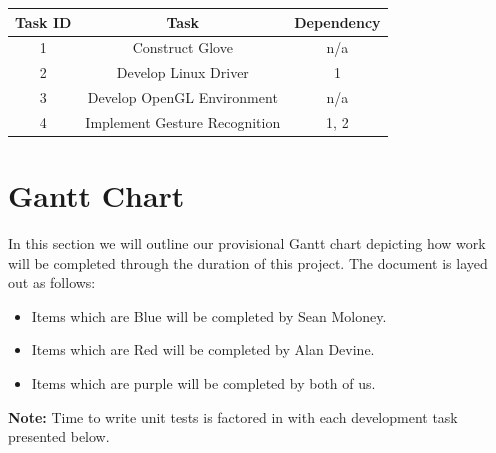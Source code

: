 \documentclass[12pt,a4paper,oneside]{book}
\theoremstyle{plain}
\numberwithin{equation}{chapter}
\newcounter{Secnum}
\begin{document}
\begin{center}
    \begin{tabular}{ |c|c|c| }
        \hline
        Task ID & Task & Dependency \\
        \hline
        \hline
        1 & Construct Glove & n/a \\
        \hline
        2 & Develop Linux Driver & 1 \\
        \hline
        3 & Develop OpenGL Environment & n/a \\
        \hline
        4 & Implement Gesture Recognition & 1, 2 \\
        \hline
    \end{tabular}
\end{center}



\section{Gantt Chart}

\noindent In this section we will outline our provisional Gantt chart depicting how work will be completed through the duration of this project. The document is layed out as follows:

\begin{itemize}
    \item Items which are Blue will be completed by Sean Moloney.
    \item Items which are Red will be completed by Alan Devine.
    \item Items which are purple will be completed by both of us.
\end{itemize}

\noindent \textbf{Note:} Time to write unit tests is factored in with each development task presented below.


\end{document}
